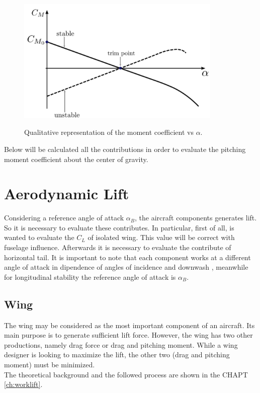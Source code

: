 \begin{figure}[H]
\centering
{\includegraphics[height=6cm]{immagini/cm}} 
\label{stabinstab}
\caption{Qualitative representation of the moment coefficient vs $\alpha$.}
\end{figure} 	


Below will be calculated all the contributions in order to evaluate the pitching moment coefficient about the center of gravity. 


\section{Aerodynamic Lift}		
 Considering a reference angle of attack $\alpha_B$, the aircraft components generates lift. So it is necessary to evaluate these contributes. In particular, first of all, is wanted to evaluate the $C_L$ of isolated wing. This value will be correct with fuselage influence. Afterwards it is necessary to evaluate the contribute of horizontal tail.  It is important to note that each component works at a different angle of attack in dipendence of angles of incidence and downwash , meanwhile for longitudinal stability the reference angle of attack is $\alpha_B$.

\subsection{Wing}
 The wing may be considered as the most important component of an aircraft. Its main purpose is  to generate sufficient lift force. However, the wing has two other productions, namely drag force or drag and pitching moment. While a wing designer is looking to maximize the lift, the other two (drag and pitching moment) must be minimized. \\
 The theoretical background and the followed process are shown in the CHAPT \ref{ch:worklift}.

